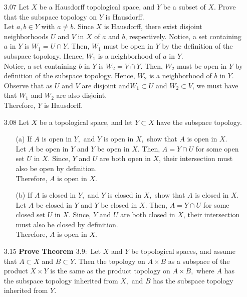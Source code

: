 \documentclass[12pt]{article}
\begin{document}
\begin{enumerate}
	\item[3.07] Let $X$ be a Hausdorff topological space, and $Y$ be a subset of $X .$ Prove that the subspace topology on $Y$ is Hausdorff.\\
	Let $ a,b\in Y $ with $ a \not= b $. Since $ X $ is Hausdorff, there exist disjoint neighborhoods $ U $ and $ V $ in $ X $ of $ a $ and $ b $, respectively. Notice, a set containing $ a $ in $ Y $ is $ W_1=U\cap Y $. Then, $ W_1 $ must be open in $ Y $ by the definition of the subspace topology. Hence, $ W_1 $ is a neighborhood of $ a $ in $ Y $. \\
	Notice, a set containing $ b $ in $ Y $ is $ W_2=V\cap Y $. Then, $ W_2 $ must be open in $ Y $ by definition of the subspace topology. Hence, $ W_2 $ is a neighborhood of $ b $ in $ Y $.\\
	Observe that as $ U $ and $V$ are disjoint and$ W_1 \subset U $ and $ W_2 \subset V $, we must have that $ W_1 $ and $ W_2 $ are also disjoint.\\
	Therefore, $ Y $ is Hausdorff.

	\item[3.08] Let $X$ be a topological space, and let $Y \subset X$ have the subspace topology.
		\begin{enumerate}
			\item[(a)] If $A$ is open in $Y ,$ and $Y$ is open in $X ,$ show that $A$ is open in $X .$\\
			Let $ A $ be open in $ Y $ and $ Y $ be open in $ X $. Then, $ A=Y\cap U $ for some open set $ U $ in $ X $. Since, $ Y $ and $ U $ are both open in $ X $, their intersection must also be open by definition.\\
			Therefore, $ A $ is open in $ X $.
			
			\item[(b)] If $A$ is closed in $Y ,$ and $Y$ is closed in $X ,$ show that $A$ is closed in $X .$\\
				Let $ A $ be closed in $ Y $ and $ Y $ be closed in $ X $. Then, $ A=Y\cap U $ for some closed set $ U $ in $ X $. Since, $ Y $ and $ U $ are both closed in $ X $, their intersection must also be closed by definition.\\
				Therefore, $ A $ is open in $ X $.
		\end{enumerate}

	\item[3.15] \textbf{Prove Theorem $3.9 :$} Let $X$ and $Y$ be topological spaces, and assume that $A \subset X$ and $B \subset Y .$ Then the topology on $A \times B$ as a subspace of the product $X \times Y$ is the same as the product topology on $A \times B ,$ where $A$ has the subspace topology inherited from $X ,$ and $B$ has the subspace topology inherited from $Y .$


\end{enumerate}
\end{document}
